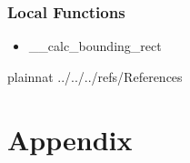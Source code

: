 \documentclass[12pt, titlepage]{article}
\begin{document}
\subsubsection{Local Functions}
\begin{itemize}
\item __calc_bounding_rect\\
\end{itemize}


\newpage

 {plainnat}
 {../../../refs/References}

\newpage

\section{Appendix} \label{Appendix}

\end{document}
